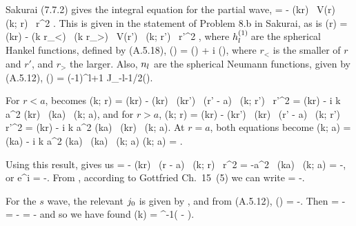 \begin{solution}
	Sakurai (7.7.2) gives the integral equation for the partial wave,
	\beqn \label{delint}
		 = - \intoi \jl(kr) \, V(r) \, \Al(k; r) \, r^2 \dr.
	\eeqn
	This is given in the statement of Problem 8.b in Sakurai, as is
	\beqn \label{radint}
		\Al(r) = \jl(kr) -  \intoi \jl(k r_<) \, \hql(k r_>) \, V(r') \, \Al(k; r') \, {r'}^2 \drp,
	\eeqn
	where $h_l^{(1)}\!$ are the spherical Hankel functions, defined by (A.5.18),
	\beqn \label{hankel}
		\hql(\rho) = \jl(\rho) + i \nl(\rho),
	\eeqn
	where $r_<$ is the smaller of $r$ and $r'$, and $r_>$ the larger.  Also, $n_l$ are the spherical Neumann functions, given by (A.5.12),
	\beq
		\nl(\rho) = (-1)^{l+1} \sqrt{\frac{\pi}{2\rho}} J_{-l-1/2}(\rho).
	\eeq
	
	For $r < a$,  becomes
	\beq
		\Al(k; r) = \jl(kr) -  \intoi \jl(kr) \, \hql(kr') \,  \del(r' - a) \, \Al(k; r') \, {r'}^2 \drp
		= \jl(kr) - i k a^2 \gam \jl(kr) \, \hql(ka) \, \Al(k; a),
	\eeq
	and for $r > a$,
	\beq
		\Al(k; r) = \jl(kr) -  \intoi \jl(kr') \, \hql(kr) \,  \del(r' - a) \, \Al(k; r') \, {r'}^2 \drp
		= \jl(kr) - i k a^2 \gam \jl(ka) \, \hql(kr) \, \Al(k; a).
	\eeq
	At $r = a$, both equations become
	\beq
		\Al(k; a) = \jl(ka) - i k a^2 \gam \hql(ka) \, \jl(ka) \, \Al(k; a)
		\qimplies
		\Al(k; a) = .
	\eeq
	
	Using this result,  gives us
	\beq
		 = - \intoi \jl(kr) \,  \del(r - a) \, \Al(k; r) \, r^2 \dr
		= -a^2 \gam \, \jl(ka) \, \Al(k; a)
		= -,
	\eeq
	or
	\beqn \label{sindelo}
		e^{i \dell} \sin\dell = -.
	\eeqn
	From , according to Gottfried Ch.~15~(5) we can write
	\beq
		\tan\dell = -.
	\eeq
	
	For the $s$ wave, the relevant $j_0$ is given by , and from (A.5.12),
	\beqn \label{no}
		\no(\rho) = -\frac{\cos\rho}{\rho}.
	\eeqn
	Then
	\beqn \label{tandelo}
		\tan\delo = -
		= -
		= -
	\eeqn
	and so we have found
	\beqn \label{delo}
		\delo(k) = \tan^{-1}\!\!\left( - \right).
	\eeqn
	\vfix
\end{solution}



